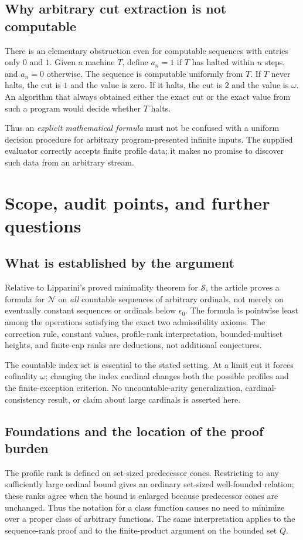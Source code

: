 \documentclass[11pt,a4paper]{article}
\theoremstyle{definition}
\newcommand{\OpN}{\mathcal N}
\newcommand{\OpS}{\mathcal S}
\begin{document}
\subsection{Why arbitrary cut extraction is not computable}\label{subsec:computability}
There is an elementary obstruction even for computable sequences with
entries only $0$ and $1$. Given a machine $T$, define $a_n=1$ if $T$ has
halted within $n$ steps, and $a_n=0$ otherwise. The sequence is computable
uniformly from $T$. If $T$ never halts, the cut is $1$ and the value is zero.
If it halts, the cut is $2$ and the value is $\omega$. An algorithm that
always obtained either the exact cut or the exact value from such a program
would decide whether $T$ halts.

Thus an \emph{explicit mathematical formula} must not be confused with a
uniform decision procedure for arbitrary program-presented infinite inputs.
The supplied evaluator correctly accepts finite profile data; it makes no
promise to discover such data from an arbitrary stream.

\section{Scope, audit points, and further questions}\label{sec:scope}

\subsection{What is established by the argument}
Relative to Lipparini's proved minimality theorem for $\OpS$, the article
proves a formula for $\OpN$ on \emph{all} countable sequences of arbitrary
ordinals, not merely on eventually constant sequences or ordinals below
$\epsilon_0$. The formula is pointwise least among the operations satisfying
the exact two admissibility axioms. The correction rule, constant values,
profile-rank interpretation, bounded-multiset heights, and finite-cap ranks
are deductions, not additional conjectures.

The countable index set is essential to the stated setting. At a limit cut
it forces cofinality $\omega$; changing the index cardinal changes both the
possible profiles and the finite-exception criterion. No uncountable-arity
generalization, cardinal-consistency result, or claim about large cardinals
is asserted here.

\subsection{Foundations and the location of the proof burden}
The profile rank is defined on set-sized predecessor cones. Restricting to
any sufficiently large ordinal bound gives an ordinary set-sized
well-founded relation; these ranks agree when the bound is enlarged because
predecessor cones are unchanged. Thus the notation for a class function
causes no need to minimize over a proper class of arbitrary functions.
The same interpretation applies to the sequence-rank proof and to the
finite-product argument on the bounded set $Q$.
\end{document}
